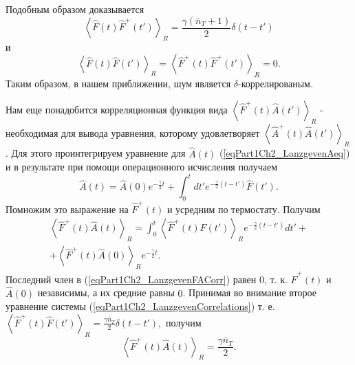 Подобным образом доказывается
\begin{equation}
\left<\hat{F}\left(t\right)\hat{F}^{+}\left(t'\right)\right>_R = 
\frac{\gamma\left(\bar{n}_{T} + 1\right)}{2} \delta\left(t - t'\right)
\label{eqPart1Ch2_Lanzgeven_Task1}
\end{equation}
и
\begin{equation}
\left<\hat{F}\left(t\right)\hat{F}\left(t'\right)\right>_R = 
\left<\hat{F}^{+}\left(t\right)\hat{F}^{+}\left(t'\right)\right>_R = 0.
\label{eqPart1Ch2_Lanzgeven_Task2}
\end{equation}
Таким образом, в нашем приближении, шум является
$\delta$-коррелированым.

Нам еще понадобится корреляционная функция вида
\(
\left<\hat{F}^{+}\left(t\right)\hat{A}\left(t'\right)\right>_R 
\) 
- необходимая для вывода уравнения, которому удовлетворяет 
\(
\left<\hat{A}^{+}\left(t\right)\hat{A}\left(t'\right)\right>_R 
\). Для этого проинтегрируем уравнение для $\hat{A}\left(t\right)$
(\ref{eqPart1Ch2_LanzgevenAeq}) и в результате при помощи
операционного исчисления получаем
\begin{equation} 
\hat{A}\left(t\right) = \hat{A}\left(0\right)e^{-\frac{\gamma}{2}t} +
\int_0^t d t' e^{-\frac{\gamma}{2}\left(t - t'\right)} \hat{F}\left(t'\right).
\nonumber
\end{equation} 
Помножим это выражение на $\hat{F}^{+}\left(t\right)$ и усредним по
термостату. Получим
\begin{eqnarray} 
\left<\hat{F}^{+}\left(t\right)\hat{A}\left(t\right)\right>_R = 
\int_0^t  
\left<\hat{F}^{+}\left(t\right)\hat{F}\left(t'\right)\right>_R 
e^{-\frac{\gamma}{2}\left(t - t'\right)}
d t' +
\nonumber \\
+ \left<\hat{F}^{+}\left(t\right)\hat{A}\left(0\right)\right>_R e^{-\frac{\gamma}{2}t}.
\label{eqPart1Ch2_LanzgevenFACorr}
\end{eqnarray} 
Последний член в (\ref{eqPart1Ch2_LanzgevenFACorr}) равен $0$, т. к. 
$\hat{F}^{+}\left(t\right)$ и $\hat{A}\left(0\right)$ независимы,
 а их средние равны $0$. Принимая во внимание второе уравнение системы 
(\ref{eqPart1Ch2_LanzgevenCorrelations}) т. е.
\(
\left<\hat{F}^{+}\left(t\right)\hat{F}\left(t'\right)\right>_R = 
\frac{\gamma \bar{n}_{T}}{2} \delta\left(t - t'\right),
\)
получим
\begin{equation}
\left<\hat{F}^{+}\left(t\right)\hat{A}\left(t\right)\right>_R = 
\frac{\gamma \bar{n}_{T}}{2}.
\nonumber
\end{equation}

